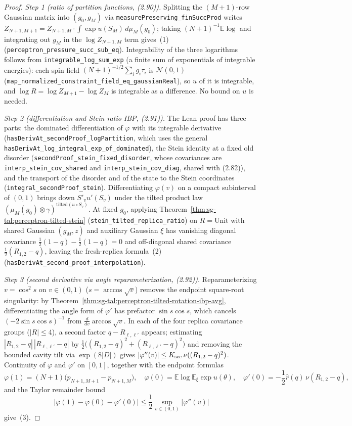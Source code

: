 \begin{proof}
  \leanok
\emph{Step 1 (ratio of partition functions, (2.90)).} Splitting the $(M+1)$-row Gaussian matrix into
$(g_0,g_M)$ via \texttt{measurePreserving\_finSuccProd} writes $Z_{N+1,M+1}=Z_{N+1,M}\cdot
\int\exp u(S_M)\,d\mu_M(g_0)$; taking $(N+1)^{-1}\mathbb E\log$ and integrating out $g_M$ in the
$\log Z_{N+1,M}$ term gives~(1) (\texttt{perceptron\_pressure\_succ\_sub\_eq}). Integrability of the three logarithms follows from \texttt{integrable\_log\_sum\_exp} (a finite sum of exponentials of integrable energies): each spin field $(N+1)^{-1/2}\sum_ig_i\tau_i$ is $\mathcal N(0,1)$ (\texttt{map\_normalized\_constraint\_field\_eq\_gaussianReal}), so $u$ of it is integrable, and $\log R=\log Z_{M+1}-\log Z_M$ is integrable as a difference. No bound on $u$ is needed.

\emph{Step 2 (differentiation and Stein ratio IBP, (2.91)).} The Lean proof has three parts: the dominated differentiation of $\varphi$ with its integrable derivative (\texttt{hasDerivAt\_secondProof\_logPartition}, which uses the general \texttt{hasDerivAt\_log\_integral\_exp\_of\_dominated}), the Stein identity at a fixed old disorder (\texttt{secondProof\_stein\_fixed\_disorder}, whose covariances are \texttt{interp\_stein\_cov\_shared} and \texttt{interp\_stein\_cov\_diag}, shared with (2.82)), and the transport of the disorder and of the state to the Stein coordinates (\texttt{integral\_secondProof\_stein}). Differentiating $\varphi(v)$ on a
compact subinterval of $(0,1)$ brings down $S'_v u'(S_v)$ under the tilted product law
$(\mu_M(g_0)\otimes\gamma)^{\mathrm{tilted}(u\circ S_v)}$. At fixed $g_0$, applying
Theorem~\ref{thm:sg-tal:perceptron-tilted-stein} (\texttt{stein\_tilted\_replica\_ratio}) on
$R=\mathrm{Unit}$ with shared Gaussian $(g_M,z)$ and auxiliary Gaussian $\xi$ has vanishing diagonal
covariance $\frac12(1-q)-\frac12(1-q)=0$ and off-diagonal shared covariance $\frac12(R_{1,2}-q)$,
leaving the fresh-replica formula~(2) (\texttt{hasDerivAt\_second\_proof\_interpolation}).

\emph{Step 3 (second derivative via angle reparameterization, (2.92)).} Reparameterizing
$v=\cos^2 s$ on $v\in(0,1)$ ($s=\arccos\sqrt v$) removes the endpoint square-root singularity: by
Theorem~\ref{thm:sg-tal:perceptron-tilted-rotation-ibp-avg}, differentiating the angle form of $\varphi'$
has prefactor $\sin s\cos s$, which cancels $(-2\sin s\cos s)^{-1}$ from $\frac{d}{dv}\arccos\sqrt v$.
In each of the four replica covariance groups ($|R|\le 4$), a second factor $q-R_{\ell,\ell'}$ appears;
estimating $|R_{1,2}-q|\,|R_{\ell,\ell'}-q|$ by $\frac12\bigl((R_{1,2}-q)^2+(R_{\ell,\ell'}-q)^2\bigr)$
and removing the bounded cavity tilt via $\exp(8|D|)$ gives
$|\varphi''(v)|\le K_{\rm sec}\,\nu((R_{1,2}-q)^2)$. Continuity of $\varphi$ and $\varphi'$ on $[0,1]$,
together with the endpoint formulas
\[
 \varphi(1)=(N+1)\bigl(p_{N+1,M+1}-p_{N+1,M}\bigr),\quad
 \varphi(0)=\mathbb E\log\mathbb E_\xi\exp u(\theta),\quad
 \varphi'(0)=-\frac12\widehat r(q)\,\nu(R_{1,2}-q),
\]
and the Taylor remainder bound
\[
 \bigl|\varphi(1)-\varphi(0)-\varphi'(0)\bigr|\le\frac12\sup_{v\in(0,1)}\bigl|\varphi''(v)\bigr|
\]
give~(3).


\end{proof}
